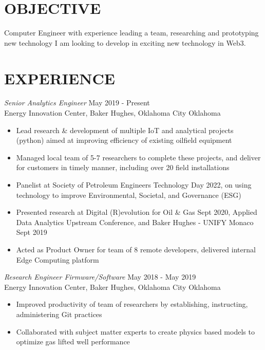\documentclass[line,margin]{res}
\begin{document}
\address{sammgtanner@gmail.com}
\address{(405) 318-6956}


\begin{resume}

	\section{OBJECTIVE}
	Computer Engineer with experience leading a team, researching and prototyping new technology I am looking to develop in exciting new technology in Web3.

	\section{EXPERIENCE}
	 {\sl Senior Analytics Engineer} \hfill May 2019 - Present \\
	Energy Innovation Center, Baker Hughes, Oklahoma City Oklahoma
	\begin{itemize} \itemsep -2pt
		\item Lead research \& development of multiple IoT and analytical projects (python) aimed at improving efficiency of existing oilfield equipment
		\item Managed local team of 5-7 researchers to complete these projects, and deliver for customers in timely manner, including over 20 field installations
  		\item Panelist at Society of Petroleum Engineers Technology Day 2022, on using technology to improve Environmental, Societal, and Governance (ESG)
		\item Presented research at Digital (R)evolution for Oil \& Gas Sept 2020, Applied Data Analytics Upstream Conference, and Baker Hughes - UNIFY Monaco Sept 2019
		\item Acted as Product Owner for team of 8 remote developers, delivered internal Edge Computing platform
	\end{itemize}
	{\sl Research Engineer Firmware/Software} \hfill May 2018 - May 2019\\
	Energy Innovation Center, Baker Hughes, Oklahoma City Oklahoma
	\begin{itemize} \itemsep -2pt
		\item Improved productivity of team of researchers by establishing, instructing, administering Git practices
		\item Collaborated with subject matter experts to create physics based models to optimize gas lifted well performance

\end{itemize}
\end{resume}
\end{document}
